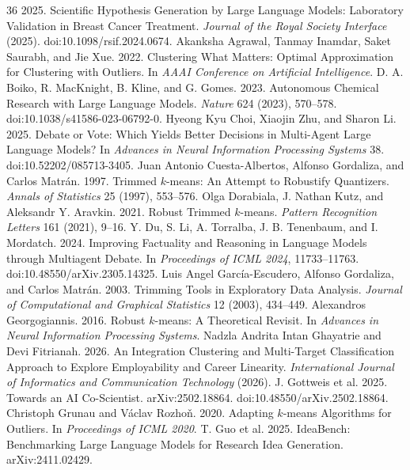 \documentclass[sigconf,review,anonymous=false]{acmart}
\begin{document}
\begin{thebibliography}{36}
 2025. Scientific Hypothesis Generation by Large Language Models: Laboratory Validation in Breast Cancer Treatment. \emph{Journal of the Royal Society Interface} (2025). doi:10.1098/rsif.2024.0674.
 Akanksha Agrawal, Tanmay Inamdar, Saket Saurabh, and Jie Xue. 2022. Clustering What Matters: Optimal Approximation for Clustering with Outliers. In \emph{AAAI Conference on Artificial Intelligence}.
 D. A. Boiko, R. MacKnight, B. Kline, and G. Gomes. 2023. Autonomous Chemical Research with Large Language Models. \emph{Nature} 624 (2023), 570--578. doi:10.1038/s41586-023-06792-0.
 Hyeong Kyu Choi, Xiaojin Zhu, and Sharon Li. 2025. Debate or Vote: Which Yields Better Decisions in Multi-Agent Large Language Models? In \emph{Advances in Neural Information Processing Systems} 38. doi:10.52202/085713-3405.
 Juan Antonio Cuesta-Albertos, Alfonso Gordaliza, and Carlos Matrán. 1997. Trimmed $k$-means: An Attempt to Robustify Quantizers. \emph{Annals of Statistics} 25 (1997), 553--576.
 Olga Dorabiala, J. Nathan Kutz, and Aleksandr Y. Aravkin. 2021. Robust Trimmed $k$-means. \emph{Pattern Recognition Letters} 161 (2021), 9--16.
 Y. Du, S. Li, A. Torralba, J. B. Tenenbaum, and I. Mordatch. 2024. Improving Factuality and Reasoning in Language Models through Multiagent Debate. In \emph{Proceedings of ICML 2024}, 11733--11763. doi:10.48550/arXiv.2305.14325.
 Luis Angel García-Escudero, Alfonso Gordaliza, and Carlos Matrán. 2003. Trimming Tools in Exploratory Data Analysis. \emph{Journal of Computational and Graphical Statistics} 12 (2003), 434--449.
 Alexandros Georgogiannis. 2016. Robust $k$-means: A Theoretical Revisit. In \emph{Advances in Neural Information Processing Systems}.
 Nadzla Andrita Intan Ghayatrie and Devi Fitrianah. 2026. An Integration Clustering and Multi-Target Classification Approach to Explore Employability and Career Linearity. \emph{International Journal of Informatics and Communication Technology} (2026).
 J. Gottweis et al. 2025. Towards an AI Co-Scientist. arXiv:2502.18864. doi:10.48550/arXiv.2502.18864.
 Christoph Grunau and Václav Rozhoň. 2020. Adapting $k$-means Algorithms for Outliers. In \emph{Proceedings of ICML 2020}.
 T. Guo et al. 2025. IdeaBench: Benchmarking Large Language Models for Research Idea Generation. arXiv:2411.02429.

\end{thebibliography}
\end{document}
